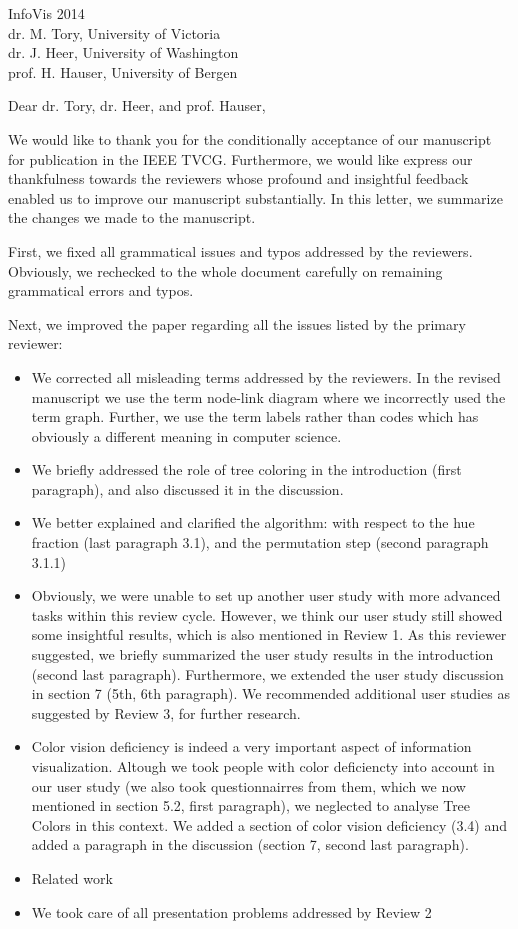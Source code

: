 \documentclass{letter}
\begin{document}
\begin{letter}{InfoVis 2014 \\ dr. M. Tory, University of Victoria \\ dr. J. Heer, University of Washington \\ prof. H. Hauser, University of Bergen}
\opening{Dear dr. Tory, dr. Heer, and prof. Hauser,}

We would like to thank you for the conditionally acceptance of our manuscript for publication in the IEEE TVCG. Furthermore, we would like express our thankfulness towards the reviewers whose profound and insightful feedback enabled us to improve our manuscript substantially. In this letter, we summarize the changes we made to the manuscript.


First, we fixed all grammatical issues and typos addressed by the reviewers. Obviously, we rechecked to the whole document carefully on remaining grammatical errors and typos.

Next, we improved the paper regarding all the issues listed by the primary reviewer:

\begin{itemize}
\item We corrected all misleading terms addressed by the reviewers. In the revised manuscript we use the term node-link diagram where we incorrectly used the term graph. Further, we use the term labels rather than codes which has obviously a different meaning in computer science.
\item We briefly addressed the role of tree coloring in the introduction (first paragraph), and also discussed it in the discussion.
\item We better explained and clarified the algorithm: with respect to the hue fraction (last paragraph 3.1), and the permutation step (second paragraph 3.1.1)
\item Obviously, we were unable to set up another user study with more advanced tasks within this review cycle. However, we think our user study still showed some insightful results, which is also mentioned in Review 1.  As this reviewer suggested, we briefly summarized the user study results in the introduction (second last paragraph). Furthermore, we extended the user study discussion in section 7 (5th, 6th paragraph). We recommended additional user studies as suggested by Review 3, for further research.
\item Color vision deficiency is indeed a very important aspect of information visualization. Altough we took people with color deficiencty into account in our user study (we also took
questionnairres from them, which we now mentioned in section 5.2, first paragraph),  we neglected to analyse Tree Colors in this context. We added a section of color vision deficiency (3.4) and added a paragraph in the discussion (section 7, second last paragraph).
\item Related work
\item We took care of all presentation problems addressed by Review 2
\end{itemize}


\end{letter}
\end{document}
